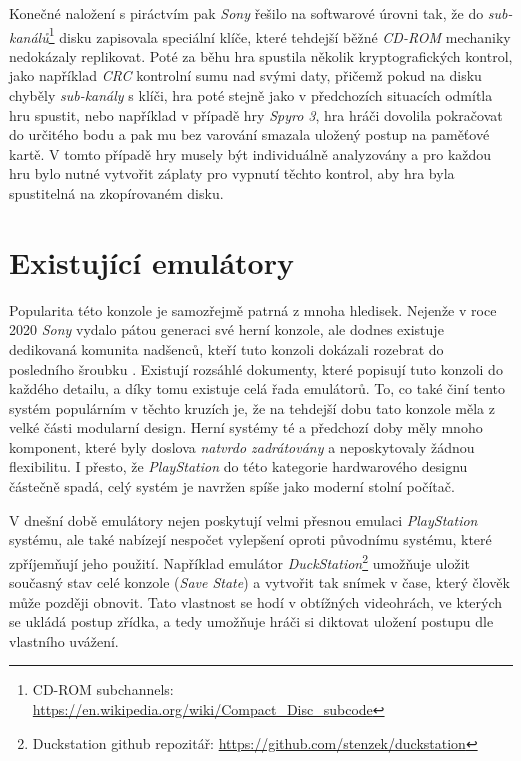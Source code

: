 Konečné naložení s piráctvím pak \textit{Sony} řešilo na softwarové úrovni tak, že do \textit{sub-kanálů}\footnote{CD-ROM subchannels: \url{https://en.wikipedia.org/wiki/Compact_Disc_subcode}} disku zapisovala speciální
klíče, které tehdejší běžné \textit{CD-ROM} mechaniky nedokázaly replikovat. Poté za běhu hra spustila několik kryptografických kontrol, jako například
\textit{CRC} kontrolní sumu nad svými daty, přičemž pokud na disku chyběly \textit{sub-kanály} s klíči, hra poté stejně jako v předchozích situacích
odmítla hru spustit, nebo například v případě hry \textit{Spyro 3}, hra hráči dovolila pokračovat do určitého bodu a pak mu bez
varování smazala uložený postup na paměťové kartě. V tomto případě hry musely být individuálně analyzovány a pro každou hru bylo
nutné vytvořit záplaty pro vypnutí těchto kontrol, aby hra byla spustitelná na zkopírovaném disku.

\section{Existující emulátory}

Popularita této konzole je samozřejmě patrná z mnoha hledisek. 
Nejenže v roce 2020 \textit{Sony} vydalo pátou generaci své herní konzole, 
ale dodnes existuje dedikovaná komunita nadšenců, kteří tuto konzoli dokázali rozebrat do posledního šroubku \cite{PSXSpec}. 
Existují rozsáhlé dokumenty, které popisují tuto konzoli do každého detailu, a díky tomu existuje celá řada emulátorů. 
To, co také činí tento systém populárním v těchto kruzích je, že na tehdejší dobu tato konzole měla z velké části modularní design. 
Herní systémy té a předchozí doby měly mnoho komponent, které byly doslova \textit{natvrdo zadrátovány} a neposkytovaly žádnou flexibilitu. 
I přesto, že \textit{PlayStation} do této kategorie hardwarového designu částečně spadá, celý systém je navržen spíše jako moderní stolní počítač.

V dnešní době emulátory nejen poskytují velmi přesnou emulaci \textit{PlayStation} systému, 
ale také nabízejí nespočet vylepšení oproti původnímu systému, které zpříjemňují jeho použití.
Například emulátor \textit{DuckStation}\footnote{Duckstation github repozitář: \url{https://github.com/stenzek/duckstation}} umožňuje uložit současný stav celé konzole (\textit{Save State}) 
a vytvořit tak snímek v čase, který člověk může později obnovit. 
Tato vlastnost se hodí v obtížných videohrách, ve kterých se ukládá postup zřídka, 
a tedy umožňuje hráči si diktovat uložení postupu dle vlastního uvážení.

